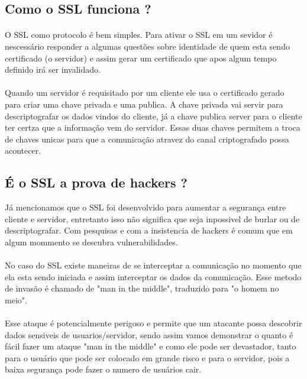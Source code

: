 \documentclass{article}
\begin{document}
  \subsection{Como o SSL funciona ?}
  \paragraph{}
  O SSL como protocolo é bem simples. Para ativar o SSL em um sevidor é
  nescessário responder a algumas questões sobre identidade de quem esta sendo
  certificado (o servidor) e assim gerar um certificado que apos algum tempo
  definido irá ser invalidado.
  \paragraph{}
    Quando um servidor é requisitado por um cliente ele usa o certificado gerado
  para criar uma chave privada e uma publica. A chave privada vai servir para
  descriptografar os dados vindos do cliente, já a chave publica server para o
  cliente ter certza que a informação vem do servidor. Essas duas chaves permitem
  a troca de chaves unicas para que a comunicação atravez do canal criptografado
  possa acontecer.

  \subsection{É o SSL a prova de hackers ?}
    Já mencionamos que o SSL foi desenvolvido para aumentar a segurança entre
  cliente e servidor, entretanto isso não significa que seja inpossivel de
  burlar ou de descriptografar. Com pesquisas e com a insistencia de hackers é
  comum que em algum mommento se descubra vulnerabilidades.
  \paragraph{}
    No caso do SSL existe maneiras de se interceptar a comunicação no momento
  que ela esta sendo iniciada e assim interceptar os dados da comunicação. Esse
  metodo de invasão é chamado de "man in the middle", traduzido para "o homem
  no meio".
  \paragraph{}
    Esse ataque é potencialmente perigoso e permite que um atacante possa
  descobrir dados sensiveis de usuarios/servidor, sendo assim vamos demonstrar
  o quanto é fácil fazer um ataque "man in the middle" e como ele pode ser
  devastador, tanto para o usuário que pode ser colocado em grande risco e
  para o servidor, pois a baixa segurança pode fazer o numero de usuários cair.
\end{document}
